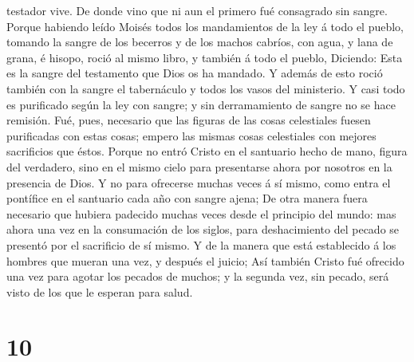 testador vive.  De donde vino que ni aun el primero fué
consagrado sin sangre.  Porque habiendo leído Moisés todos
los mandamientos de la ley á todo el pueblo, tomando la sangre de los
becerros y de los machos cabríos, con agua, y lana de grana, é hisopo,
roció al mismo libro, y también á todo el pueblo, 
Diciendo: Esta es la sangre del testamento que Dios os ha mandado.
 Y además de esto roció también con la sangre el
tabernáculo y todos los vasos del ministerio.  Y casi todo
es purificado según la ley con sangre; y sin derramamiento de sangre no
se hace remisión.  Fué, pues, necesario que las figuras de
las cosas celestiales fuesen purificadas con estas cosas; empero las
mismas cosas celestiales con mejores sacrificios que éstos.
 Porque no entró Cristo en el santuario hecho de mano,
figura del verdadero, sino en el mismo cielo para presentarse ahora por
nosotros en la presencia de Dios.  Y no para ofrecerse
muchas veces á sí mismo, como entra el pontífice en el santuario cada
año con sangre ajena;  De otra manera fuera necesario que
hubiera padecido muchas veces desde el principio del mundo: mas ahora
una vez en la consumación de los siglos, para deshacimiento del pecado
se presentó por el sacrificio de sí mismo.  Y de la manera
que está establecido á los hombres que mueran una vez, y después el
juicio;  Así también Cristo fué ofrecido una vez para
agotar los pecados de muchos; y la segunda vez, sin pecado, será visto
de los que le esperan para salud.

\hypertarget{section-9}{%
\section{10}\label{section-9}}

